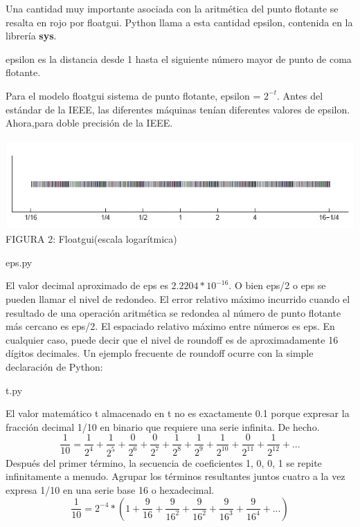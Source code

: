 \documentclass[12pt]{article}
\begin{document}
Una cantidad muy importante asociada con la aritmética del punto flotante se resalta en rojo
por floatgui. Python llama a esta cantidad epsilon, contenida en la librer\'ia \textbf{sys}.
\begin{center}
epsilon es la distancia desde 1 hasta el siguiente número mayor de punto de coma flotante.
\end{center}
Para el modelo floatgui sistema de punto flotante, epsilon = $2^{-t}$.
Antes del estándar de la IEEE, las diferentes máquinas tenían diferentes valores de epsilon. Ahora,para doble precisión de la IEEE.
\begin{center}
  \includegraphics[scale=0.65]{fig2}
  FIGURA 2: Floatgui(escala logar\'itmica)\\
\end{center}
\begin{center}
  
  {eps.py}
\end{center}
El valor decimal aproximado de eps es $2.2204*10^{-16}$. O bien eps/2 o eps se pueden
llamar el nivel de redondeo. El error relativo máximo incurrido cuando el resultado de una
operación aritmética se redondea al número de punto flotante más cercano es eps/2. El
espaciado relativo máximo entre números es eps. En cualquier caso, puede decir que el nivel
de roundoff es de aproximadamente 16 dígitos decimales.
Un ejemplo frecuente de roundoff ocurre con la simple declaración de Python:
\begin{center}

{t.py}
\end{center}
El valor matemático t almacenado en t no es exactamente 0.1 porque expresar la fracción
decimal 1/10 en binario que requiere una serie infinita. De hecho.
$$\frac{1}{10} = \frac{1}{2^4} + \frac{1}{2^5} + \frac{0}{2^6} + \frac{0}{2^7} + \frac{1}{2^8} + \frac{1}{2^9} + \frac{1}{2^{10}} + \frac{0}{2^{11}}+ \frac{1}{2^{12}}+ ...$$
Después del primer término, la secuencia de coeficientes 1, 0, 0, 1 se repite infinitamente a
menudo. Agrupar los términos resultantes juntos cuatro a la vez expresa 1/10 en una serie
base 16 o hexadecimal.
$$\frac{1}{10} = 2^{-4}*(1+\frac{9}{16}+\frac{9}{16^2}+\frac{9}{16^2}+\frac{9}{16^3}+\frac{9}{16^4}+...)$$
\end{document}
